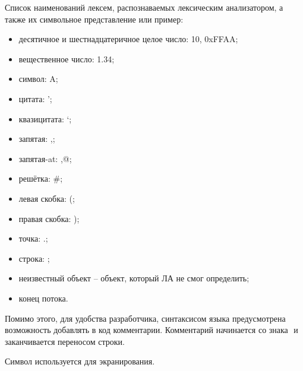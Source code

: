 Список наименований лексем, распознаваемых лексическим анализатором, а также их символьное представление или пример:
\begin{itemize}
	\item десятичное и шестнадцатеричное целое число: 10, 0xFFAA;
	\item вещественное число: 1.34;
	\item символ: A;
	\item цитата: ';
	\item квазицитата: `;
	\item запятая: ,;
	\item запятая-at: ,@;
	\item решётка: \#;
	\item левая скобка: (;
	\item правая скобка: );
	\item точка: .;
	\item строка: ;
	\item неизвестный объект -- объект, который ЛА не смог определить;
	\item конец потока.
\end{itemize}

Помимо этого, для удобства разработчика, синтаксисом языка предусмотрена возможность добавлять в код комментарии. Комментарий начинается со знака ‭\quotes{;} и заканчивается переносом строки.

Символ \quotes{\textbackslash} используется для экранирования.


